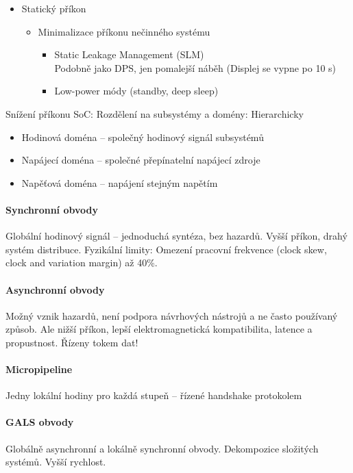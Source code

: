\documentclass[a4paper, 11pt]{report}
\begin{document}
\begin{itemize}
\begin{itemize}
\begin{itemize}
		\end{itemize}
	\end{itemize}
	\item Statický příkon
	\begin{itemize}
		\item Minimalizace příkonu nečinného systému
		\begin{itemize}
			\item Static Leakage Management (SLM)\\
			Podobně jako DPS, jen pomalejší náběh (Displej se vypne po 10 s)
			\item Low-power módy (standby, deep sleep)
		\end{itemize}
	\end{itemize}
\end{itemize}

Snížení příkonu SoC: Rozdělení na subsystémy a domény: Hierarchicky

\begin{itemize}
	\item Hodinová doména -- společný hodinový signál subsystémů
	\item Napájecí doména -- společné přepínatelní napájecí zdroje
	\item Napěťová doména -- napájení stejným napětím
\end{itemize}

\paragraph{Synchronní obvody}
Globální hodinový signál -- jednoduchá syntéza, bez hazardů. Vyšší příkon, drahý systém distribuce. Fyzikální limity: Omezení pracovní frekvence (clock skew, clock and variation margin) až 40\%.

\paragraph{Asynchronní obvody}
Možný vznik hazardů, není podpora návrhových nástrojů a ne často používaný způsob. Ale nižší příkon, lepší elektromagnetická kompatibilita, latence a propustnost. Řízeny tokem dat!

\paragraph{Micropipeline}
Jedny lokální hodiny pro každá stupeň -- řízené handshake protokolem 

\paragraph{GALS obvody}
Globálně asynchronní a lokálně synchronní obvody. Dekompozice složitých systémů. Vyšší rychlost.
\end{document}
